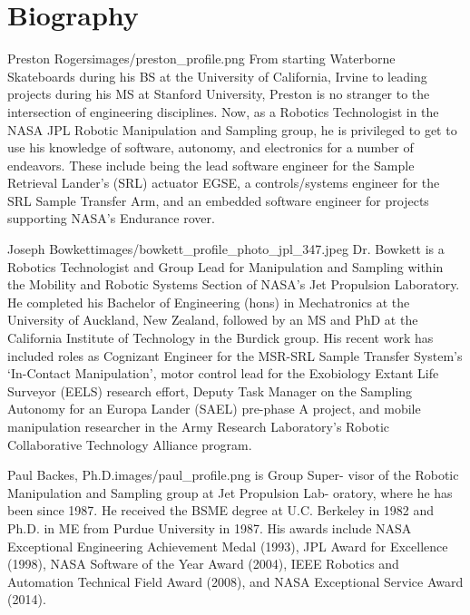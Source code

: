 \documentclass[twocolumn,letterpaper]{IEEEAerospaceCLS}  %
\begin{document}
\section*{Biography}

\begin{biographywithpic}
{Preston Rogers}{images/preston_profile.png}
From starting Waterborne Skateboards during his BS at the University of California, Irvine to leading projects during his MS at Stanford University, Preston is no stranger to the intersection of engineering disciplines. Now, as a Robotics Technologist in the NASA JPL Robotic Manipulation and Sampling group, he is privileged to get to use his knowledge of software, autonomy, and electronics for a number of endeavors. These include being the lead software engineer for the Sample Retrieval Lander’s (SRL) actuator EGSE, a controls/systems engineer for the SRL Sample Transfer Arm, and an embedded software engineer for projects supporting NASA’s Endurance rover.
\end{biographywithpic} 

\begin{biographywithpic}
{Joseph Bowkett}{images/bowkett_profile_photo_jpl_347.jpeg}
Dr. Bowkett is a Robotics Technologist and Group Lead for Manipulation and Sampling within the Mobility and Robotic Systems Section of NASA's Jet Propulsion Laboratory. He completed his Bachelor of Engineering (hons) in Mechatronics at the University of Auckland, New Zealand, followed by an MS and PhD at the California Institute of Technology in the Burdick group. His recent work has included roles as Cognizant Engineer for the MSR-SRL Sample Transfer System's `In-Contact Manipulation', motor control lead for the Exobiology Extant Life Surveyor (EELS) research effort, Deputy Task Manager on the Sampling Autonomy for an Europa Lander (SAEL) pre-phase A project, and mobile manipulation researcher in the Army Research Laboratory's Robotic Collaborative Technology Alliance program.
\end{biographywithpic} 

\begin{biographywithpic}
{Paul Backes, Ph.D.}{images/paul_profile.png} 
is Group Super-
visor of the Robotic Manipulation and
Sampling group at Jet Propulsion Lab-
oratory, where he has been since 1987.
He received the BSME degree at U.C.
Berkeley in 1982 and Ph.D. in ME from
Purdue University in 1987. His awards
include NASA Exceptional Engineering
Achievement Medal (1993), JPL Award
for Excellence (1998), NASA Software
of the Year Award (2004), IEEE Robotics and Automation
Technical Field Award (2008), and NASA Exceptional Service
Award (2014).
\end{biographywithpic}


\printbibliography
\end{document}

